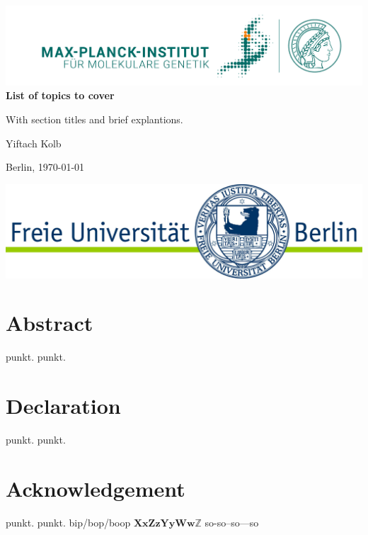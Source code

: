 \documentclass[11pt, a4paper]{report}
\theoremstyle{plain}
\theoremstyle{definition}
\theoremstyle{remark}
\newcommand{\X}{\mathbf{X}}
\newcommand{\x}{\mathbf{x}}
\newcommand{\Z}{\mathbf{Z}}
\newcommand{\z}{\mathbf{z}}
\newcommand{\Y}{\mathbf{Y}}
\newcommand{\y}{\mathbf{y}}
\newcommand{\W}{\mathbf{W}}
\newcommand{\w}{\mathbf{w}}
\begin{document}
\begin{titlepage}
\begin{center}
{\includegraphics{images/MPIMG_RGB_gruen.png}}\\
\vspace*{1cm}
\Large
\textbf{List of topics to cover}



\large
With section titles and brief explantions.
\vfill

Yiftach Kolb

Berlin, \today

\vfill
{\includegraphics{images/fu-logo_bildschirm_RGB1.jpg}}
\end{center}
\end{titlepage}


\chapter*{Abstract}
punkt.
punkt.
\nocite{guo2017improved}

\chapter*{Declaration}
punkt.
punkt.
\nocite{bishop2006pattern}
\nocite{serre2001matrices}
\nocite{kingma2013auto}
\nocite{lotfollahi2018generative}

\chapter*{Acknowledgement}
punkt.\cite{kingma2013auto}
punkt.
bip/bop\slash boop
$\X \x \Z \z \Y \y \W \w \mathbb{Z}$
so-so--so---so
\end{document}
